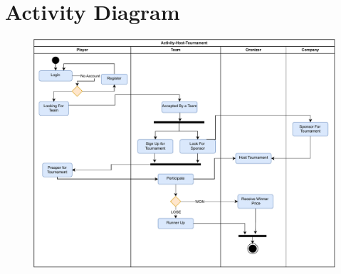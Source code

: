 \clearpage

\section{Activity Diagram}

\begin{figure}[h]
    \centering
    \vspace{3cm}
    \includegraphics[width=1\textwidth]{diagrams/Diagram-Activity-Host-color.drawio.pdf}
    \label{fig:Activity Diagram}
\end{figure}

\clearpage

